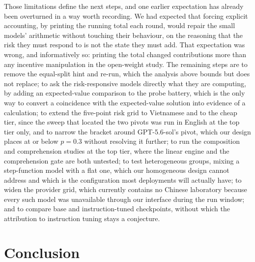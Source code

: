 \documentclass[openacc]{rsproca_new}
\begin{document}
Those limitations define the next steps, and one earlier expectation has already been overturned in a way worth recording. We had expected that forcing explicit accounting, by printing the running total each round, would repair the small models' arithmetic without touching their behaviour, on the reasoning that the risk they must respond to is not the state they must add. That expectation was wrong, and informatively so: printing the total changed contributions more than any incentive manipulation in the open-weight study. The remaining steps are to remove the equal-split hint and re-run, which the analysis above bounds but does not replace; to ask the risk-responsive models directly what they are computing, by adding an expected-value comparison to the probe battery, which is the only way to convert a coincidence with the expected-value solution into evidence of a calculation; to extend the five-point risk grid to Vietnamese and to the cheap tier, since the sweep that located the two pivots was run in English at the top tier only, and to narrow the bracket around GPT-5.6-sol's pivot, which our design places at or below $p=0.3$ without resolving it further; to run the composition and comprehension studies at the top tier, where the linear engine and the comprehension gate are both untested; to test heterogeneous groups, mixing a step-function model with a flat one, which our homogeneous design cannot address and which is the configuration most deployments will actually have; to widen the provider grid, which currently contains no Chinese laboratory because every such model was unavailable through our interface during the run window; and to compare base and instruction-tuned checkpoints, without which the attribution to instruction tuning stays a conjecture.

\section{Conclusion}
\end{document}
